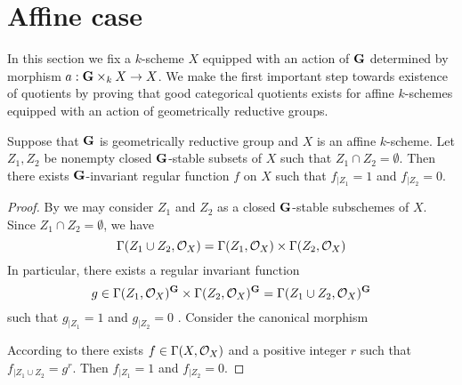 \section{Affine case}
\noindent
In this section we fix a $k$-scheme $X$ equipped with an action of $\mathbf{G}$ determined by morphism $a:\mathbf{G}\times_kX\rightarrow X$. We make the first important step towards existence of quotients by proving that good categorical quotients exists for affine $k$-schemes equipped with an action of geometrically reductive groups. 

\begin{proposition}\label{proposition:invariant_functions_separate_closed_sets_for_geometrically_reductive}
Suppose that $\mathbf{G}$ is geometrically reductive group and $X$ is an affine $k$-scheme. Let $Z_1,Z_2$ be nonempty closed $\mathbf{G}$-stable subsets of $X$ such that $Z_1\cap Z_2 = \emptyset$. Then there exists $\mathbf{G}$-invariant regular function $f$ on $X$ such that $f_{\mid Z_1} = 1$ and $f_{\mid Z_2} = 0$.
\end{proposition}
\begin{proof}
By {\cite[Corollary 6.4]{Algebraic_groups}} we may consider $Z_1$ and $Z_2$ as a closed $\mathbf{G}$-stable subschemes of $X$. Since $Z_1\cap Z_2 = \emptyset$, we have 
$$\Gamma(Z_1\cup Z_2,{\mathcal O}_X) = \Gamma(Z_1,{\mathcal O}_X)\times \Gamma(Z_2,{\mathcal O}_X)$$
In particular, there exists a regular invariant function 
$$g \in \Gamma(Z_1,{\mathcal O}_X)^{\mathbf{G}}\times \Gamma(Z_2,{\mathcal O}_X)^{\mathbf{G}} = \Gamma(Z_1\cup Z_2,{\mathcal O}_X)^{\mathbf{G}}$$
such that $g_{\mid Z_1} = 1$ and $g_{\mid Z_2} = 0$
. Consider the canonical morphism
\begin{center}
\end{center}
According to {\cite[Theorem 2.4]{Geometrically_reductive_and_Nagata}} there exists $f\in \Gamma(X,{\mathcal O}_X)$ and a positive integer $r$ such that $f_{\mid Z_1\cup Z_2} = g^r$. Then $f_{\mid Z_1} = 1$ and $f_{\mid Z_2}=0$.
\end{proof}

